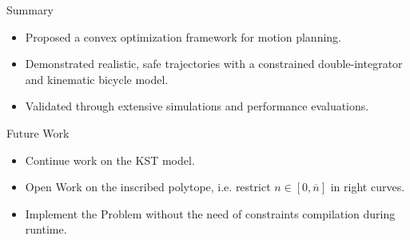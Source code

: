 \documentclass[shortpres,aspectratio=43]{beamer}
\newcommand\blfootnote[1]{%
  \begingroup
  \renewcommand\thefootnote{}\footnote{#1}%
  \addtocounter{footnote}{-1}%
  \endgroup
}
\begin{document}
\begin{frame}{Summary}
  \begin{itemize}
    \item Proposed a convex optimization framework for motion planning.
    \item Demonstrated realistic, safe trajectories with a constrained double-integrator and kinematic bicycle model.
    \item Validated through extensive simulations and performance evaluations.
  \end{itemize}
\end{frame}

\begin{frame}{Future Work}
  \begin{itemize}
    \item Continue work on the KST model.
    \item Open Work on the inscribed polytope, i.e. restrict $n\in[0,\overline{n}]$ in right curves.
    \item Implement the Problem without the need of constraints compilation during runtime.
  \end{itemize}
\end{frame}


\end{document}
